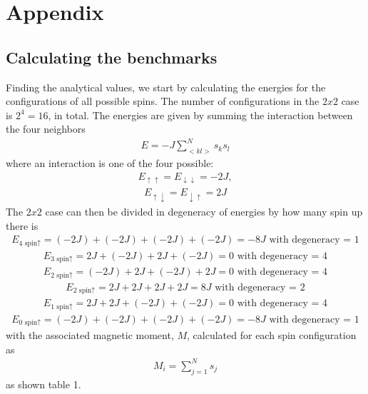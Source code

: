 \documentclass[12pt,english,a4paper]{article}
\begin{document}
\section{Appendix}

\subsection{Calculating the benchmarks}


Finding the analytical values, we start by calculating the energies for the configurations of all possible spins. The number of configurations in the $2x2$ case is  $2^4 = 16$, in total. The energies are given by summing the interaction between the four neighbors
\begin{align*}
    E = -J \sum_{<kl>}^N s_ks_l 
\end{align*}
where an interaction is one of the four possible:
\begin{align*}
    E_{\uparrow \uparrow} = E_{\downarrow \downarrow} = -2J, 
\end{align*}
\begin{align*}
    E_{\uparrow \downarrow} = E_{\downarrow \uparrow} = 2J
\end{align*}
The $2x2$ case can then be divided in degeneracy of energies by how many spin up there is
\begin{align*}
    E_{\text{4 spin}\uparrow} = (-2J) + (-2J) + (-2J) + (-2J) = -8J \text{ with degeneracy = 1}
\end{align*}
\begin{align*}
    E_{\text{3 spin}\uparrow} = 2J + (-2J) + 2J + (-2J) = 0 \text{ with degeneracy = 4}
\end{align*}
\begin{align*}
    E_{\text{2 spin}\uparrow} = (-2J) + 2J + (-2J) + 2J = 0 \text{ with degeneracy = 4}
\end{align*}
\begin{align*}
    E_{\text{2 spin}\uparrow} = 2J + 2J + 2J + 2J = 8J \text{ with degeneracy = 2}
\end{align*}
\begin{align*}
    E_{\text{1 spin}\uparrow} = 2J + 2J + (-2J) + (-2J) = 0 \text{ with degeneracy = 4}
\end{align*}
\begin{align*}
    E_{\text{0 spin}\uparrow} = (-2J) + (-2J) + (-2J) + (-2J) = -8J \text{ with degeneracy = 1}
\end{align*}
with the associated magnetic moment, $M$, calculated for each spin configuration as
\begin{align*}
    M_{i}=\sum_{j=1}^{N} s_{j}
\end{align*}
as shown table 1.
\end{document}
